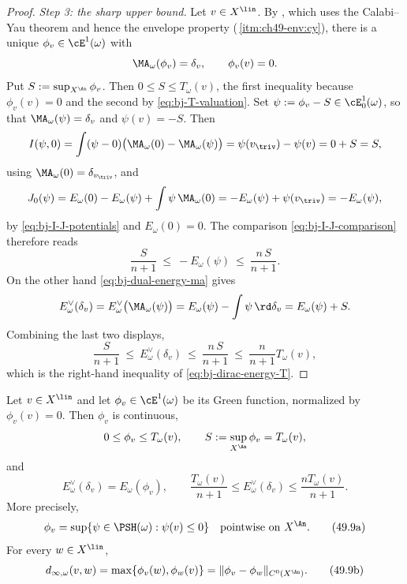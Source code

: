 \begin{proof}
\emph{Step 3: the sharp upper bound.}  Let $v\in X^{\lin}$.  By
, which uses the Calabi--Yau theorem
 and hence the envelope property
(\,\cref{itm:ch49-env:cy}), there is a unique
$\phi_v\in\cE^1(\omega)$ with
\[
 \MA_\omega(\phi_v)=\delta_v,\qquad\phi_v(v)=0 .
\]
Put $S:=\sup_{X^{\An}}\phi_v$.  Then $0\le S\le T_\omega(v)$, the first
inequality because $\phi_v(v)=0$ and the second by
\eqref{eq:bj-T-valuation}.  Set $\psi:=\phi_v-S\in\cE^1_0(\omega)$, so
that $\MA_\omega(\psi)=\delta_v$ and $\psi(v)=-S$.  Then
\[
 I(\psi,0)=\int(\psi-0)\bigl(\MA_\omega(0)-\MA_\omega(\psi)\bigr)
 =\psi(v_{\triv})-\psi(v)=0+S=S,
\]
using $\MA_\omega(0)=\delta_{v_{\triv}}$, and
\[
 J_0(\psi)=E_\omega(0)-E_\omega(\psi)+\int\psi\,\MA_\omega(0)
 =-E_\omega(\psi)+\psi(v_{\triv})=-E_\omega(\psi),
\]
by \eqref{eq:bj-I-J-potentials} and $E_\omega(0)=0$.  The comparison
\eqref{eq:bj-I-J-comparison} therefore reads
\[
 \frac{S}{n+1}\ \le\ -E_\omega(\psi)\ \le\ \frac{n\,S}{n+1}.
\]
On the other hand \eqref{eq:bj-dual-energy-ma} gives
\[
 E^\vee_\omega(\delta_v)=E^\vee_\omega\bigl(\MA_\omega(\psi)\bigr)
 =E_\omega(\psi)-\int\psi\,\rd\delta_v=E_\omega(\psi)+S .
\]
Combining the last two displays,
\[
 \frac{S}{n+1}\ \le\ E^\vee_\omega(\delta_v)\ \le\ \frac{n\,S}{n+1}
 \ \le\ \frac{n}{n+1}T_\omega(v),
\tag{49.9}\label{eq:ch49-dirac-refined}
\]
which is the right-hand inequality of \eqref{eq:bj-dirac-energy-T}.
\end{proof}

\begin{corollary}
\label{cor:ch49-green-invariants}
Let $v\in X^{\lin}$ and let $\phi_v\in\cE^1(\omega)$ be its Green
function, normalized by $\phi_v(v)=0$.  Then $\phi_v$ is continuous,
\[
 0\le\phi_v\le T_\omega(v),\qquad
 S:=\sup_{X^{\An}}\phi_v=T_\omega(v),
\]
and
\[
 E^\vee_\omega(\delta_v)=E_\omega(\phi_v),\qquad
 \frac{T_\omega(v)}{n+1}\le E^\vee_\omega(\delta_v)
 \le\frac{nT_\omega(v)}{n+1}.
\]
More precisely,
\[
 \phi_v=\sup\{\psi\in\PSH(\omega):\psi(v)\le0\}
 \quad\text{pointwise on }X^{\An}.
 \tag{49.9a}\label{eq:ch49-green-envelope}
\]
For every $w\in X^{\lin}$,
\[
 d_{\infty,\omega}(v,w)
 =\max\{\phi_v(w),\phi_w(v)\}
 =\|\phi_v-\phi_w\|_{C^0(X^{\An})}.
 \tag{49.9b}\label{eq:ch49-green-isometry}
\]
\end{corollary}

